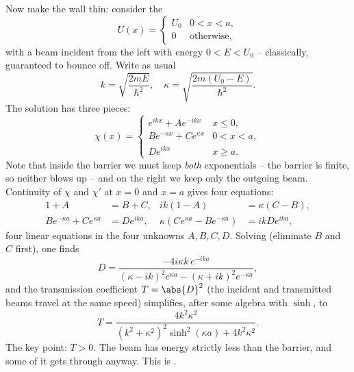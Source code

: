 Now make the wall thin: consider the 
$$
U(x) = \begin{cases}
    U_0 & 0 < x < a, \\
    0 & \text{otherwise},
\end{cases}
$$
with a beam incident from the left with energy $0 < E < U_0$ -- classically, guaranteed to bounce off. Write as usual
$$
k = \sqrt{\frac{2mE}{\hbar^2}}, \quad \kappa = \sqrt{\frac{2m(U_0 - E)}{\hbar^2}}.
$$
The solution has three pieces:
$$
\chi(x) = \begin{cases}
    e^{ikx} + A e^{-ikx} & x \leq 0, \\
    B e^{-\kappa x} + C e^{\kappa x} & 0 < x < a, \\
    D e^{ikx} & x \geq a.
\end{cases}
$$
Note that inside the barrier we must keep \emph{both} exponentials -- the barrier is finite, so neither blows up -- and on the right we keep only the outgoing beam. Continuity of $\chi$ and $\chi'$ at $x = 0$ and $x = a$ gives four equations:
\begin{align*}
    1 + A &= B + C, & ik(1 - A) &= \kappa(C - B), \\
    B e^{-\kappa a} + C e^{\kappa a} &= D e^{ika}, & \kappa(C e^{\kappa a} - B e^{-\kappa a}) &= ik D e^{ika},
\end{align*}
four linear equations in the four unknowns $A, B, C, D$. Solving (eliminate $B$ and $C$ first), one finds
$$
D = \frac{-4 i \kappa k \, e^{-ika}}{(\kappa - ik)^2 e^{\kappa a} - (\kappa + ik)^2 e^{-\kappa a}},
$$
and the transmission coefficient $T = \abs{D}^2$ (the incident and transmitted beams travel at the same speed) simplifies, after some algebra with $\sinh$, to
$$
T = \frac{4 k^2 \kappa^2}{(k^2 + \kappa^2)^2 \sinh^2 (\kappa a) + 4 k^2 \kappa^2}.
$$
The key point: \emph{$T > 0$}. The beam has energy strictly less than the barrier, and some of it gets through anyway. This is .

